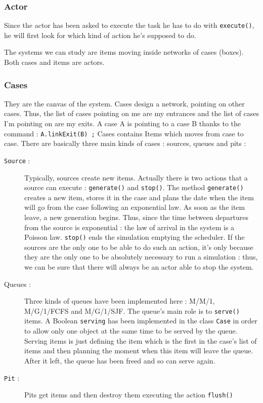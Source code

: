 \documentclass[a4paper]{report}
\begin{document}
\subsubsection{Actor}
Since the actor has been asked to execute the task he has to do with \texttt{execute()}, he will first look for which kind of action he's supposed to do. \\ 
\par
The systems we can study are items moving inside networks of cases (boxes). Both cases and items are actors.

\subsubsection{Cases}
They are the canvas of the system. Cases design a network, pointing on other cases. Thus, the list of cases pointing on me are my entrances and the list of cases I'm pointing on are my exits. A case A is pointing to a case B thanks to the command : \texttt{A.linkExit(B) ;} 
Cases contains Items which moves from case to case. There are basically three main kinds of cases : sources, queues and pits :

\begin{description}
\item[\texttt{Source} :] Typically, sources create new items. Actually there is two actions that a source can execute : \texttt{generate()} and \texttt{stop()}. The method \texttt{generate()} creates a new item, stores it in the case and plans the date when the item will go from the case following an exponential law. As soon as the item leave, a new generation begins. Thus, since the time between departures from the source is exponential : the law of arrival in the system is a Poisson law. \texttt{stop()} ends the simulation emptying the scheduler. If the sources are the only one to be able to do such an action, it's only because they are the only one to be absolutely necessary to run a simulation : thus, we can be sure that there will always be an actor able to stop the system.
\item[Queues :] Three kinds of queues have been implemented here : M\slash M\slash 1, M\slash G\slash 1\slash FCFS and M\slash G\slash 1\slash SJF. The queue's main role is to \texttt{serve()} items. A Boolean \texttt{serving} has been implemented in the class \texttt{Case} in order to allow only one object at the same time to be served by the queue. Serving items is just defining the item which is the first in the case's list of items and then planning the moment when this item will leave the queue. After it left, the queue has been freed and so can serve again.
\item[\texttt{Pit} :] Pits get items and then destroy them executing the action \texttt{flush()}
\end{description}
\end{document}
